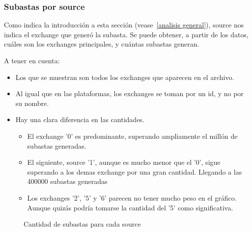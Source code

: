 \documentclass[a4paper, 12pt]{article}
\begin{document}
	\subsubsection{Subastas por source}
	 Como indica la introducción a esta sección (vease~\ref{analisis general}), source nos indica el exchange que generó la subasta. Se puede obtener, a partir de los datos, cuáles son los exchanges principales, y cuántas subastas generan.

	 A tener en cuenta:
	\begin{itemize}
		\item Los que se muestran son todos los exchanges que aparecen en el archivo.
		\item Al igual que en las plataformas, los exchanges se toman por un id, y no por su nombre.
		\item Hay una clara diferencia en las cantidades.
		\begin{itemize}
			\item El exchange '0' es predominante, superando ampliamente el millón de subastas generadas.
			\item El siguiente, source '1', aunque es mucho menor que el '0', sigue superando a los demas exchange por una gran cantidad. Llegando a las 400000 subastas generadas
			\item Los exchanges '2', '5' y '6' parecen no tener mucho peso en el gráfico. Aunque quizás podría tomarse la cantidad del '5' como significativa.
		\end{itemize}
	\end{itemize}

		\begin{figure}[H]
			\centering
		   	\caption{Cantidad de subastas para cada source}
			\label{subastassource}
		\end{figure}
\end{document}
